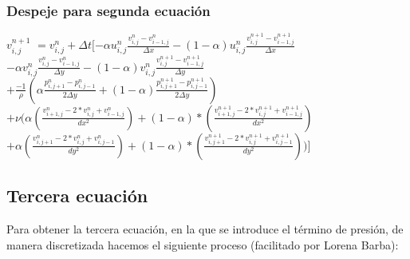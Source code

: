 \documentclass[a4paper]{article}
\begin{document}
~\\
~\\

\subsubsection{Despeje para segunda ecuación}

$ {v}^{n+1}_{i,j}  $
$= v^{n}_{i,j} + \Delta t [- \alpha {u}^{n}_{i,j} \frac{ {v}^{n}_{i,j} - v^{n}_{i-1,j}}{ \Delta x} - (1 - \alpha) {u}^{n}_{i,j} \frac{ {v}^{n+1}_{i,j} - v^{n+1}_{i-1,j}}{ \Delta x}$ 
\\
$- \alpha {v}^{n}_{i,j} \frac{ {v}^{n}_{i,j} - v^{n}_{i-1,j}}{ \Delta y} - (1 - \alpha) {v}^{n}_{i,j} \frac{ {v}^{n+1}_{i,j} - v^{n+1}_{i-1,j}}{ \Delta y}$
\\
$+ \frac{-1}{\rho} ( \alpha \frac{p^{n}_{i,j+1} - p^{n}_{i,j-1} }{ 2 \Delta y } + (1 - \alpha) \frac{p^{n+1}_{i,j+1} - p^{n+1}_{i,j-1} }{ 2 \Delta y })  $
\\
$+ \nu (\alpha (\frac{ v^{n}_{i+1,j} - 2*v^{n}_{i,j} + v^{n}_{i-1,j}}{dx^2}) + (1-\alpha)*(\frac{ v^{n+1}_{i+1,j} - 2*v^{n+1}_{i,j} + v^{n+1}_{i-1,j}}{dx^2})$
\\
$+ \alpha (\frac{ v^{n}_{i,j+1} - 2*v^{n}_{i,j} + v^{n}_{i,j-1}}{dy^2}) + (1-\alpha)*(\frac{ v^{n+1}_{i,j+1} - 2*v^{n+1}_{i,j} + v^{n+1}_{i,j-1}}{dy^2}))]$



\subsection{Tercera ecuación}

Para obtener la tercera ecuación, en la que se introduce el término de presión, de manera discretizada hacemos el siguiente proceso (facilitado por Lorena Barba):
\end{document}
